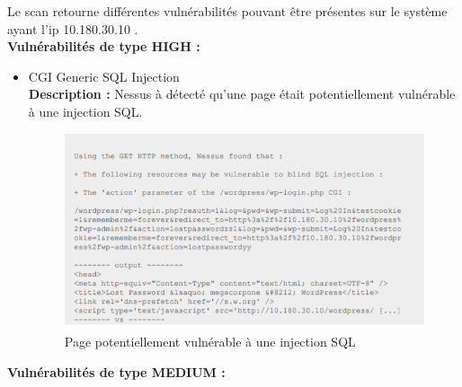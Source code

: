 \documentclass[french,paper=a4,oneside,captions=tableheading]{article}
\begin{document}
Le scan retourne différentes vulnérabilités pouvant être présentes sur le système ayant l'ip 10.180.30.10 .\\
\textbf{Vulnérabilités de type HIGH :}\\
\begin{itemize}
    \item CGI Generic SQL Injection \\
\textbf{Description :}
Nessus à détecté qu'une page était potentiellement vulnérable à une injection SQL. 

\begin{figure}[H]
    \centering
    \includegraphics[width=11cm]{images/injection_sql.png}
    \caption{Page potentiellement vulnérable à une injection SQL}
    \label{fig:sqlinjection}
\end{figure}

\end{itemize}


\textbf{Vulnérabilités de type MEDIUM :}\\
\end{document}
